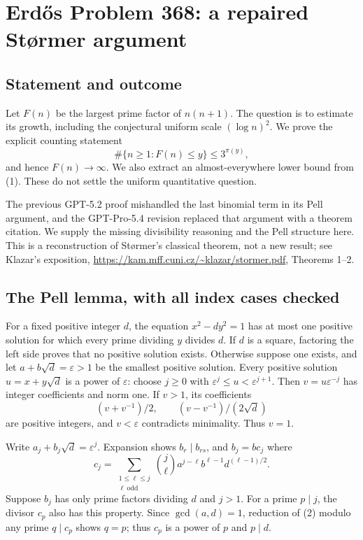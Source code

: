 \section*{Erd\H{o}s Problem 368: a repaired St\o rmer argument}
\subsection*{Statement and outcome}
Let $F(n)$ be the largest prime factor of $n(n+1)$. The question is to estimate its growth, including the conjectural uniform scale $(\log n)^2$. We prove the explicit counting statement
\[
 \#\{n\ge1:F(n)\le y\}\le3^{\pi(y)}, \tag{1}
\]
and hence $F(n)\to\infty$. We also extract an almost-everywhere lower bound from (1). These do not settle the uniform quantitative question.

The previous GPT-5.2 proof mishandled the last binomial term in its Pell argument, and the GPT-Pro-5.4 revision replaced that argument with a theorem citation. We supply the missing divisibility reasoning and the Pell structure here. This is a reconstruction of St\o rmer's classical theorem, not a new result; see Klazar's exposition, \url{https://kam.mff.cuni.cz/~klazar/stormer.pdf}, Theorems 1--2.

\subsection*{The Pell lemma, with all index cases checked}
For a fixed positive integer $d$, the equation $x^2-dy^2=1$ has at most one positive solution for which every prime dividing $y$ divides $d$.
If $d$ is a square, factoring the left side proves that no positive solution exists. Otherwise suppose one exists, and let $a+b\sqrt d=\varepsilon>1$ be the smallest positive solution. Every positive solution $u=x+y\sqrt d$ is a power of $\varepsilon$: choose $j\ge0$ with $\varepsilon^j\le u<\varepsilon^{j+1}$. Then $v=u\varepsilon^{-j}$ has integer coefficients and norm one. If $v>1$, its coefficients
\[
 (v+v^{-1})/2,\qquad(v-v^{-1})/(2\sqrt d)
\]
are positive integers, and $v<\varepsilon$ contradicts minimality. Thus $v=1$.

Write $a_j+b_j\sqrt d=\varepsilon^j$. Expansion shows $b_r\mid b_{rs}$, and $b_j=b c_j$ where
\[
 c_j=\sum_{\substack{1\le \ell\le j\\\ell\ \mathrm{odd}}}
       \binom j\ell a^{j-\ell}b^{\ell-1}d^{(\ell-1)/2}. \tag{2}
\]
Suppose $b_j$ has only prime factors dividing $d$ and $j>1$. For a prime $p\mid j$, the divisor $c_p$ also has this property. Since $\gcd(a,d)=1$, reduction of (2) modulo any prime $q\mid c_p$ shows $q=p$; thus $c_p$ is a power of $p$ and $p\mid d$.

